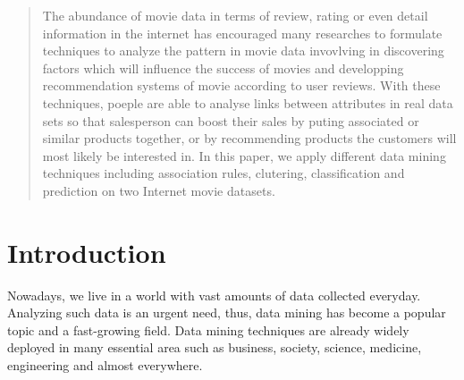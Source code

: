 \documentclass[conference]{IEEEtran}
\begin{document}




\maketitle

\begin{abstract}
The abundance of movie data in terms of review, rating or even detail information in the internet has encouraged many researches to formulate techniques to analyze the pattern in movie data invovlving in discovering factors which will influence the success of movies and  developping recommendation systems of movie according to user reviews. With these techniques, poeple are able to analyse links between attributes in real data sets so that salesperson can boost their sales by puting associated or similar products together, or by recommending products the customers will most likely be interested in.  In this paper, we apply different data mining techniques including association rules, clutering, classification and prediction on two Internet movie datasets.

\end{abstract}





%
\IEEEpeerreviewmaketitle



\section{Introduction}
Nowadays, we live in a world with vast amounts of data collected everyday. Analyzing such data is an urgent need, thus, data mining has become a popular topic and a fast-growing field. Data mining techniques are already widely deployed in many essential area such as business, society, science, medicine, engineering and almost everywhere\cite{jiawei}.
\end{document}
